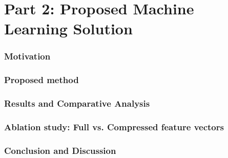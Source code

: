 \documentclass[11pt,a4paper]{article}
\theoremstyle{definition}
\theoremstyle{remark}
\begin{document}
\newpage
\part*{Part 2: Proposed Machine Learning Solution}
\label{sec:part_2}



\section{Motivation}


\section{Proposed method}


\section{Results and Comparative Analysis}


\section{Ablation study: Full vs. Compressed feature vectors}


\section{Conclusion and Discussion}




\newpage


\end{document}
